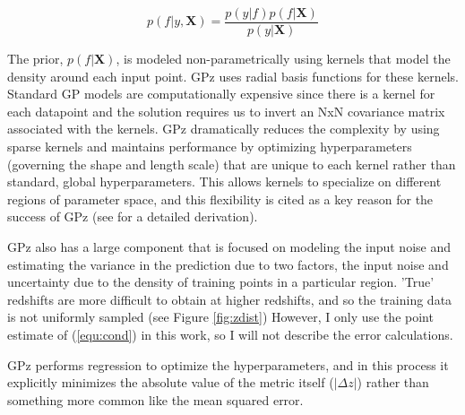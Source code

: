 \documentclass[13pt]{amsart}
\newcommand{\bX}{\textbf{X}}
\newcommand{\nequ}[2]{\begin{equation}#1 \label{#2}\end{equation}}
\newcommand{\equin}[1]{\(#1\)}
\begin{document}
      \nequ{p(f|y,\bX) = \frac{p(y|f) p(f|\bX)}{p(y|\bX)}}{equ:cond}

      The prior, \equin{p(f|\bX)}, is modeled non-parametrically using kernels that model the density around each input point. GPz uses radial basis functions for these kernels. Standard GP models are computationally expensive since there is a kernel for each datapoint and the solution requires us to invert an NxN covariance matrix associated with the kernels. GPz dramatically reduces the complexity by using sparse kernels and maintains performance by optimizing hyperparameters (governing the shape and length scale) that are unique to each kernel rather than standard, global hyperparameters. This allows kernels to specialize on different regions of parameter space, and this flexibility is cited as a key reason for the success of GPz (see \cite{sgp} for a detailed derivation).

      GPz also has a large component that is focused on modeling the input noise and estimating the variance in the prediction due to two factors, the input noise and uncertainty due to the density of training points in a particular region. 'True' redshifts are more difficult to obtain at higher redshifts, and so the training data is not uniformly sampled (see Figure \ref{fig:zdist}) However, I only use the point estimate of (\ref{equ:cond}) in this work, so I will not describe the error calculations.

      GPz performs regression to optimize the hyperparameters, and in this process it explicitly minimizes the absolute value of the metric itself
      (\equin{| \Delta z |})
      rather than something more common like the mean squared error.


\end{document}
